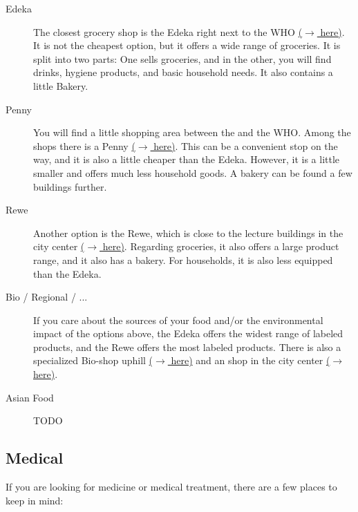 \begin{description}
      \item[Edeka]
            The closest grocery shop is the Edeka right next to the WHO \href{https://maps.app.goo.gl/DTd9KutteiG8m5L1A}{($\xrightarrow{}$ here)}. It is not the cheapest option, but it offers a wide range of groceries. It is split into two parts: One sells groceries, and in the other, you will find drinks, hygiene products, and basic household needs. It also contains a little Bakery.

      \item[Penny]
            You will find a little shopping area between the  and the WHO. Among the shops there is a Penny \href{https://maps.app.goo.gl/7F1s1fUtsefv49gv8}{($\xrightarrow{}$ here)}. This can be a convenient stop on the way, and it is also a little cheaper than the Edeka. However, it is a little smaller and offers much less household goods. A bakery can be found a few buildings further.

      \item[Rewe]
            Another  option is the Rewe, which is close to the lecture buildings in the city center \href{https://maps.app.goo.gl/Sj6d82QsJSTaGCuv5}{($\xrightarrow{}$ here)}. Regarding groceries, it also offers a large product range, and it also has a bakery. For households, it is also less equipped than the Edeka.

      \item[Bio / Regional / ...]
            If you care about the sources of your food and/or the environmental impact of the options above, the Edeka offers the widest range of  labeled products, and the Rewe offers the most  labeled products. There is also a specialized Bio-shop uphill \href{https://maps.app.goo.gl/EEEsyTK1hGbJ5H1B6}{($\xrightarrow{}$ here)} and an  shop in the city center \href{https://maps.app.goo.gl/8ppTPAT6ZfP2TXeg6}{($\xrightarrow{}$ here)}.

      \item[Asian Food]
            {\color{darkred} TODO}
\end{description}

\subsection{Medical}
If you are looking for medicine or medical treatment, there are a few places to keep in mind:

